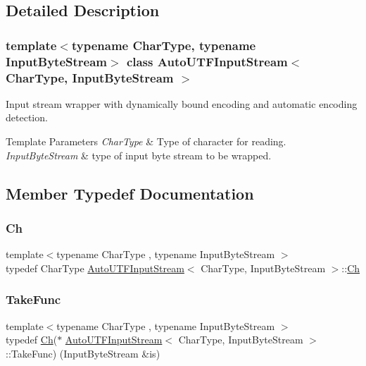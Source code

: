 \subsection{Detailed Description}
\subsubsection*{template$<$typename Char\+Type, typename Input\+Byte\+Stream$>$\newline
class Auto\+U\+T\+F\+Input\+Stream$<$ Char\+Type, Input\+Byte\+Stream $>$}

Input stream wrapper with dynamically bound encoding and automatic encoding detection. 


\begin{DoxyTemplParams}{Template Parameters}
{\em Char\+Type} & Type of character for reading. \\
\hline
{\em Input\+Byte\+Stream} & type of input byte stream to be wrapped. \\
\hline
\end{DoxyTemplParams}


\subsection{Member Typedef Documentation}
\mbox{\label{classAutoUTFInputStream_a3bb3eb46f2c20404a7ac21963cfe348f}} 
\subsubsection{\texorpdfstring{Ch}{Ch}}
{\footnotesize\ttfamily template$<$typename Char\+Type , typename Input\+Byte\+Stream $>$ \\
typedef Char\+Type \hyperlink{classAutoUTFInputStream}{Auto\+U\+T\+F\+Input\+Stream}$<$ Char\+Type, Input\+Byte\+Stream $>$\+::\hyperlink{classAutoUTFInputStream_a3bb3eb46f2c20404a7ac21963cfe348f}{Ch}}

\mbox{\label{classAutoUTFInputStream_a106a0af4b098cc88e1dba285b8f563ae}} 
\subsubsection{\texorpdfstring{Take\+Func}{TakeFunc}}
{\footnotesize\ttfamily template$<$typename Char\+Type , typename Input\+Byte\+Stream $>$ \\
typedef \hyperlink{classAutoUTFInputStream_a3bb3eb46f2c20404a7ac21963cfe348f}{Ch}($\ast$ \hyperlink{classAutoUTFInputStream}{Auto\+U\+T\+F\+Input\+Stream}$<$ Char\+Type, Input\+Byte\+Stream $>$\+::Take\+Func) (Input\+Byte\+Stream \&is)\hspace{0.3cm}{\ttfamily [private]}}



